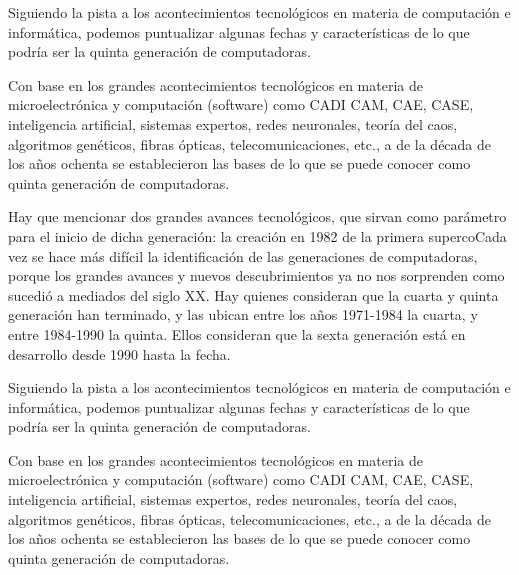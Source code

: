 \documentclass[10pt,a4paper]{article}
\begin{document}
\begin{multicols}{2}
Siguiendo la pista a los acontecimientos tecnológicos en materia de computación e informática, podemos puntualizar algunas fechas y características de lo que podría ser la quinta generación de computadoras.

Con base en los grandes acontecimientos tecnológicos en materia de microelectrónica y computación (software) como CADI CAM, CAE, CASE, inteligencia artificial, sistemas expertos, redes neuronales, teoría del caos, algoritmos genéticos, fibras ópticas, telecomunicaciones, etc., a de la década de los años ochenta se establecieron las bases de lo que se puede conocer como quinta generación de computadoras.

Hay que mencionar dos grandes avances tecnológicos, que sirvan como parámetro para el inicio de dicha generación: la creación en 1982 de la primera supercoCada vez se hace más difícil la identificación de las generaciones de computadoras, porque los grandes avances y nuevos descubrimientos ya no nos sorprenden como sucedió a mediados del siglo XX. Hay quienes consideran que la cuarta y quinta generación han terminado, y las ubican entre los años 1971-1984 la cuarta, y entre 1984-1990 la quinta. Ellos consideran que la sexta generación está en desarrollo desde 1990 hasta la fecha.

Siguiendo la pista a los acontecimientos tecnológicos en materia de computación e informática, podemos puntualizar algunas fechas y características de lo que podría ser la quinta generación de computadoras.

Con base en los grandes acontecimientos tecnológicos en materia de microelectrónica y computación (software) como CADI CAM, CAE, CASE, inteligencia artificial, sistemas expertos, redes neuronales, teoría del caos, algoritmos genéticos, fibras ópticas, telecomunicaciones, etc., a de la década de los años ochenta se establecieron las bases de lo que se puede conocer como quinta generación de computadoras.


\end{multicols}
\end{document}
